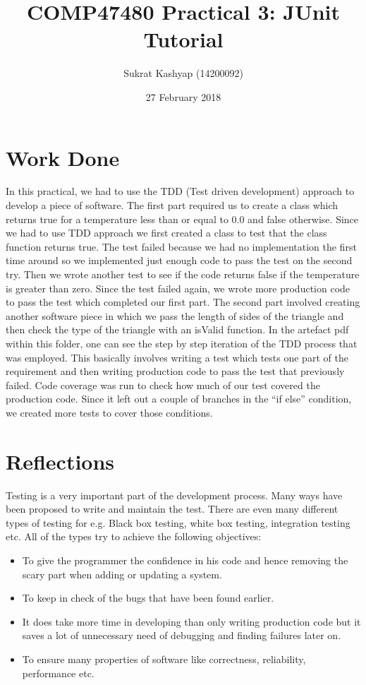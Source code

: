 \documentclass[12pt]{article}
\title{\vspace{-3.0cm}COMP47480 Practical 3: JUnit Tutorial}
\author{Sukrat Kashyap (14200092)}
\date{27 February 2018}
\begin{document}
\maketitle

\section{Work Done}

In this practical, we had to use the TDD (Test driven development) approach to develop a piece of software. The first part required us to create a class which returns true for a temperature less than or equal to 0.0 and false otherwise. Since we had to use TDD approach we first created a class to test that the class function returns true. The test failed because we had no implementation the first time around so we implemented just enough code to pass the test on the second try. Then we wrote another test to see if the code returns false if the temperature is greater than zero. Since the test failed again, we wrote more production code to pass the test which completed our first part. The second part involved creating another software piece in which we pass the length of sides of the triangle and then check the type of the triangle with an isValid function. In the artefact pdf within this folder, one can see the step by step iteration of the TDD process that was employed. This basically involves writing a test which tests one part of the requirement and then writing production code to pass the test that previously failed. Code coverage was run to check how much of our test covered the production code. Since it left out a couple of branches in the ``if else'' condition, we created more tests to cover those conditions.

\section{Reflections}

Testing is a very important part of the development process. Many ways have been proposed to write and maintain the test. There are even many different types of testing for e.g. Black box testing, white box testing, integration testing etc. All of the types try to achieve the following objectives:

\begin{itemize}
    \item To give the programmer the confidence in his code and hence removing the scary part when adding or updating a system.
    \item To keep in check of the bugs that have been found earlier.
    \item It does take more time in developing than only writing production code but it saves a lot of unnecessary need of debugging and finding failures later on.
    \item To ensure many properties of software like correctness, reliability, performance etc.
\end{itemize}
\end{document}
